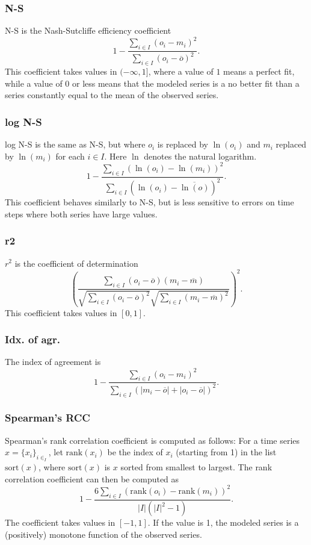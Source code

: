\documentclass[11pt]{article}
\theoremstyle{definition}
\begin{document}
\subsubsection{N-S}
N-S is the Nash-Sutcliffe efficiency coefficient \cite{nashsutcliffe70}
\[
1 - \frac{\sum_{i\in I}(o_i - m_i)^2}{\sum_{i\in I}(o_i-\overline{o})^2}.
\]
This coefficient takes values in $(-\infty, 1]$, where a value of $1$ means a perfect fit, while a value of $0$ or less means that the modeled series is a no better fit than a series constantly equal to the mean of the observed series.

\subsubsection{log N-S}
log N-S is the same as N-S, but where $o_i$ is replaced by $\ln(o_i)$ and $m_i$ replaced by $\ln(m_i)$ for each $i\in I$. Here $\ln$ denotes the natural logarithm.
\[
1 - \frac{\sum_{i\in I}(\ln(o_i) - \ln(m_i))^2}{\sum_{i\in I}(\ln(o_i)-\overline{\ln(o)})^2}.
\]
This coefficient behaves similarly to N-S, but is less sensitive to errors on time steps where both series have large values.

\subsubsection{r2}
$r^2$ is the coefficient of determination
\[
\left(\frac{\sum_{i\in I}(o_i-\overline{o})(m_i-\overline{m})}{\sqrt{\sum_{i\in I}(o_i-\overline{o})^2}\sqrt{\sum_{i\in I}(m_i-\overline{m})^2}}\right)^2.
\]
This coefficient takes values in $[0, 1]$.

\subsubsection{Idx. of agr.}
The index of agreement is
\[
1 - \frac{\sum_{i\in I}(o_i-m_i)^2}{\sum_{i\in I}(|m_i-\overline{o}| + |o_i-\overline{o}|)^2}.
\]

\subsubsection{Spearman's RCC}
Spearman's rank correlation coefficient \cite{spearman04} is computed as follows: For a time series $x=\{x_i\}_{i\in_I}$, let $\mathrm{rank}(x_i)$ be the index of $x_i$ (starting from 1) in the list $\mathrm{sort}(x)$, where $\mathrm{sort}(x)$ is $x$ sorted from smallest to largest. The rank correlation coefficient can then be computed as
\[
1 - \frac{6\sum_{i\in I}(\mathrm{rank}(o_i)-\mathrm{rank}(m_i))^2}{|I|(|I|^2 - 1)}.
\]
The coefficient takes values in $[-1, 1]$. If the value is 1, the modeled series is a (positively) monotone function of the observed series.




\end{document}
